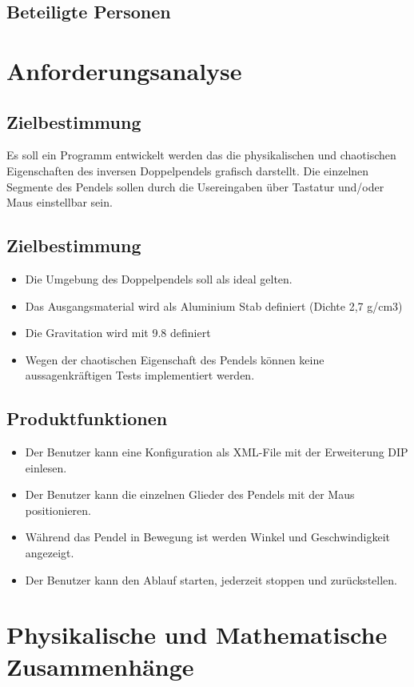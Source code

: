 \documentclass[12pt]{article}
\begin{document}
\subsection{Beteiligte Personen}


\section{Anforderungsanalyse}
\subsection{Zielbestimmung}
Es soll ein Programm entwickelt werden das die physikalischen und chaotischen Eigenschaften des inversen Doppelpendels grafisch darstellt.
Die einzelnen Segmente des Pendels sollen durch die Usereingaben über Tastatur und/oder Maus einstellbar sein.

\subsection{Zielbestimmung}
\begin{itemize}
	\item Die Umgebung des Doppelpendels soll als ideal gelten.
	\item Das Ausgangsmaterial wird als Aluminium Stab definiert (Dichte 2,7 g/cm3)
	\item Die Gravitation wird mit 9.8 definiert
	\item Wegen der chaotischen Eigenschaft des Pendels können keine aussagenkräftigen Tests implementiert werden.
\end{itemize}

\subsection{Produktfunktionen}
\begin{itemize}
	\item Der Benutzer kann eine Konfiguration als XML-File mit der Erweiterung DIP einlesen.
	\item Der Benutzer kann die einzelnen Glieder des Pendels mit der Maus positionieren.
	\item Während das Pendel in Bewegung ist werden Winkel und Geschwindigkeit angezeigt.
	\item Der Benutzer kann den Ablauf starten, jederzeit stoppen und zurückstellen.
\end{itemize}

\newpage
\section{Physikalische und Mathematische Zusammenhänge}
\end{document}
